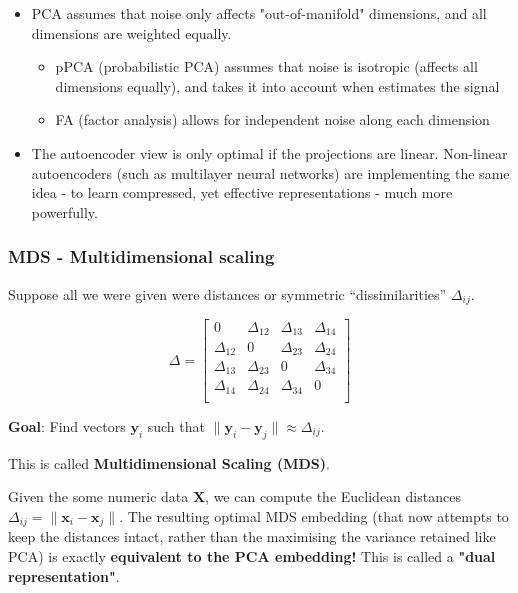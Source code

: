 \documentclass[11pt]{article}
\begin{document}
\begin{itemize}
	\item PCA assumes that noise only affects "out-of-manifold" dimensions, and all dimensions are weighted equally.
	\begin{itemize}
		\item pPCA (probabilistic PCA) assumes that noise is isotropic (affects all dimensions equally), and takes it into account when estimates the signal
		\item FA (factor analysis) allows for independent noise along each dimension
	\end{itemize}
	\item The autoencoder view is only optimal if the projections are linear. Non-linear autoencoders (such as multilayer neural networks) are implementing the same idea - to learn compressed, yet effective representations - much more powerfully.
\end{itemize} 


\subsubsection{MDS - Multidimensional scaling}

Suppose all we were given were distances or symmetric
``dissimilarities'' $\Delta_{ij}$.

\[
\Delta =
\begin{bmatrix}
  0 & \Delta_{12} & \Delta_{13} & \Delta_{14} \\
  \Delta_{12} & 0 & \Delta_{23} & \Delta_{24} \\
  \Delta_{13} & \Delta_{23} & 0 & \Delta_{34} \\
  \Delta_{14} & \Delta_{24} & \Delta_{34} & 0 \\
\end{bmatrix}
\]

\vspace{0.5cm}

\textbf{Goal}: Find vectors $\mathbf{y}_i$ such that $\| \mathbf{y}_i - \mathbf{y}_j
\| \approx \Delta_{ij}$. 

\vspace{0.5cm}

This is called \textbf{Multidimensional Scaling (MDS)}.

\vspace{0.5cm}
Given the some numeric data $\mathbf{X}$, we can compute the Euclidean distances $\Delta_{ij} = \| \mathbf{x}_i - \mathbf{x}_j \| $. The resulting optimal MDS embedding (that now attempts to keep the distances intact, rather than the maximising the variance retained like PCA) is exactly \textbf{equivalent to the PCA embedding!} This is called a \textbf{"dual representation"}.
\end{document}

